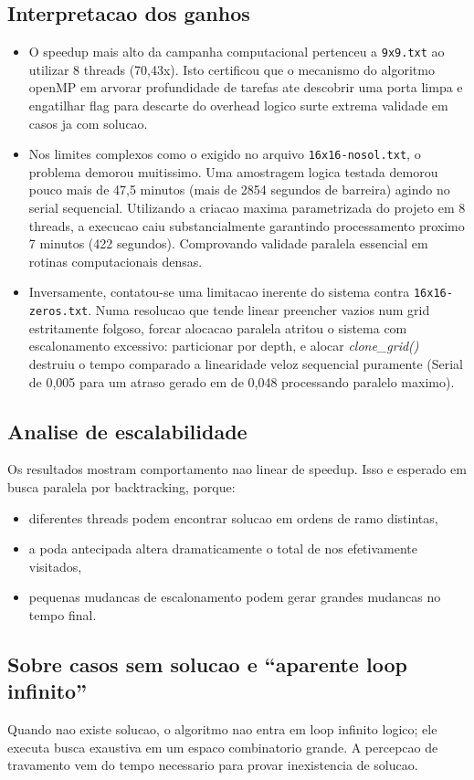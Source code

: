 \documentclass[11pt,a4paper]{article}
\begin{document}
\subsection{Interpretacao dos ganhos}
\begin{itemize}
  \item O speedup mais alto da campanha computacional pertenceu a \texttt{9x9.txt} ao utilizar 8 threads (70,43x). Isto certificou que o mecanismo do algoritmo openMP em arvorar profundidade de tarefas ate descobrir uma porta limpa e engatilhar flag para descarte do overhead logico surte extrema validade em casos ja com solucao.
  \item Nos limites complexos como o exigido no arquivo \texttt{16x16-nosol.txt}, o problema demorou muitissimo. Uma amostragem logica testada demorou pouco mais de 47,5 minutos (mais de 2854 segundos de barreira) agindo no serial sequencial. Utilizando a criacao maxima parametrizada do projeto em 8 threads, a execucao caiu substancialmente garantindo processamento proximo 7 minutos (422 segundos). Comprovando validade paralela essencial em rotinas computacionais densas.
  \item Inversamente, contatou-se uma limitacao inerente do sistema contra \texttt{16x16-zeros.txt}. Numa resolucao que tende linear preencher vazios num grid estritamente folgoso, forcar alocacao paralela atritou o sistema com escalonamento excessivo: particionar por depth, e alocar \textit{clone\_grid()} destruiu o tempo comparado a linearidade veloz sequencial puramente (Serial de 0,005 para um atraso gerado em de 0,048 processando paralelo maximo).
\end{itemize}

\subsection{Analise de escalabilidade}
Os resultados mostram comportamento nao linear de speedup. Isso e esperado em busca paralela por backtracking, porque:
\begin{itemize}
  \item diferentes threads podem encontrar solucao em ordens de ramo distintas,
  \item a poda antecipada altera dramaticamente o total de nos efetivamente visitados,
  \item pequenas mudancas de escalonamento podem gerar grandes mudancas no tempo final.
\end{itemize}

\subsection{Sobre casos sem solucao e ``aparente loop infinito''}
Quando nao existe solucao, o algoritmo nao entra em loop infinito logico; ele executa busca exaustiva em um espaco combinatorio grande. A percepcao de travamento vem do tempo necessario para provar inexistencia de solucao.
\end{document}
